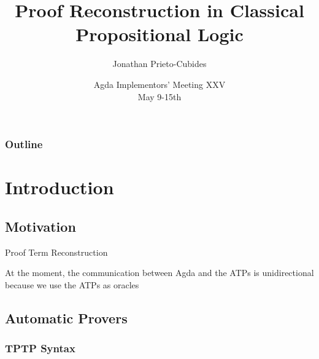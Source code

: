 \documentclass[xetex,hyperref={pdfpagelabels=false}]{beamer}
\title{\textbf{Proof Reconstruction in Classical Propositional Logic}}
\date{Agda Implementors’ Meeting XXV\\
May 9-15th
}
\author{Jonathan Prieto-Cubides}
\institute{
Advisor: Andr\'es Sicard-Ram\'irez\\[3mm]
Universidad EAFIT\\
Medell\'in, Colombia}
\begin{document}
\setcounter{page}{1}

\begin{frame}[plain]
  \titlepage
\end{frame}


\begin{frame}
  \frametitle{Outline}
  \tableofcontents
\end{frame}

\section{Introduction}
\subsection{Motivation}

\begin{frame}
Proof Term Reconstruction

At the moment, the communication between Agda and
the ATPs is unidirectional because we use the ATPs as oracles

\end{frame}



\subsection{Automatic Provers}

\subsubsection{TPTP Syntax}
\end{document}
